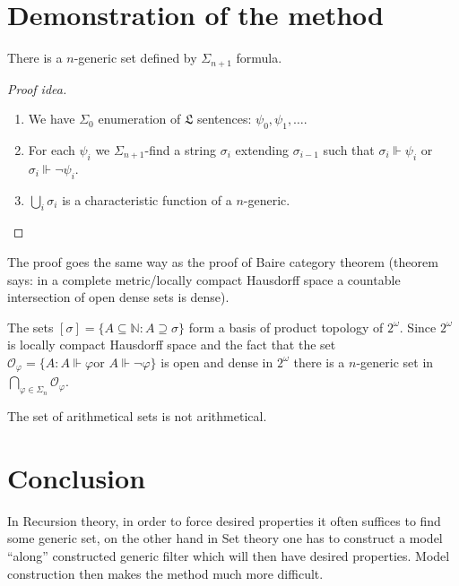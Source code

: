 \documentclass{js}
\newcommand\m[1]{\mathbb { #1 }}
\newcommand\p[1]{\mathcal{ #1 }}
\newcommand\N{\ensuremath{\m N}}
\let \forces \Vdash
\begin{document}
\section{Demonstration of the method}

\begin{theorem}
    There is a $n$-generic set defined by $\Sigma_{n+1}$ formula.
\end{theorem}

\begin{proof}[Proof idea]
    \begin{enumerate}
        \item We have $\Sigma_0$ enumeration of $\mathfrak L$ sentences: $\psi_0, \psi_1, \dots$.
        \item For each $\psi_i$ we $\Sigma_{n+1}$-find a string $\sigma_i$ extending $\sigma_{i-1}$ such that $\sigma_i \forces \psi_i$ or $\sigma_i \forces \neg\psi_i$.
        \item $\bigcup_i \sigma_i$ is a characteristic function of a $n$-generic.
    \end{enumerate}
\end{proof}

The proof goes the same way as the proof of Baire category theorem (theorem says:
in a complete metric/locally compact Hausdorff space a countable intersection
of open dense sets is dense).

The sets $[\sigma] = \{ A \subseteq \N: A \supseteq \sigma \}$ form a basis of
product topology of $2^\omega$. Since $2^\omega$ is locally compact Hausdorff
space and the fact that the set $\p O_\varphi = \{A : A \forces \varphi \text {
or } A \forces \neg\varphi\}$ is open and dense in $2^\omega$ there is a
$n$-generic set in $\bigcap_{\varphi \in \Sigma_n} \p O_\varphi$.


\begin{theorem}
    The set of arithmetical sets is not arithmetical.
\end{theorem}

\section{Conclusion}
In Recursion theory, in order to force desired properties it often suffices to
find some generic set, on the other hand in Set theory one has to construct a
model ``along'' constructed generic filter which will then have desired
properties. Model construction then makes the method much more difficult.
\end{document}
